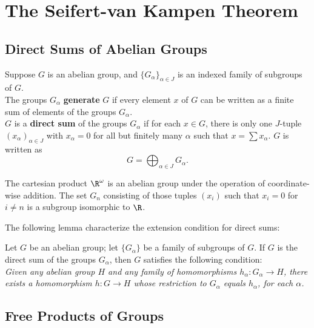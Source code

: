 \newpage

\section{The Seifert-van Kampen Theorem}

\setcounter{subsection}{66}
\subsection{Direct Sums of Abelian Groups}

\begin{definition}
Suppose $G$ is an abelian group, and $\{ G_\alpha \}_{\alpha \in J}$ is an indexed family of subgroups of $G$. \\

The groups $G_\alpha$ \textbf{generate} $G$ if every element $x$ of $G$ can be written as a finite sum of elements of the groups $G_\alpha$. \\

$G$ is a \textbf{direct sum} of the groups $G_\alpha$ if for each $x \in G$, there is only one $J$-tuple $(x_\alpha)_{\alpha \in J}$ with $x_\alpha = 0$ for all 
but finitely many $\alpha$ such that $x = \sum x_\alpha$. $G$ is written as
\[
    G = \bigoplus_{\alpha \in J} G_\alpha.
\]
\end{definition}

\begin{eg}
The cartesian product $\R^\omega$ is an abelian group under the operation of coordinate-wise addition. The set $G_n$ consisting 
of those tuples $(x_i)$ such that $x_i = 0$ for $i \neq n$ is a subgroup isomorphic to $\R$.
\end{eg}

The following lemma characterize the extension condition for direct sums:
\begin{lemma}
Let $G$ be an abelian group; let $\{ G_\alpha \}$ be a family of subgroups of $G$. If $G$ is the direct sum of the groups $G_\alpha$, then
$G$ satisfies the following condition: \\

\textit{Given any abelian group $H$ and any family of homomorphisms $h_\alpha \colon G_\alpha \rightarrow H$, there exists a homomorphism $h\colon G \rightarrow H$ whose restriction
to $G_\alpha$ equals $h_\alpha$, for each $\alpha$.}
\end{lemma}

\subsection{Free Products of Groups}

